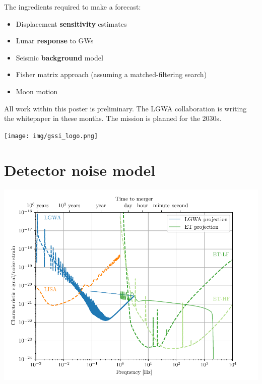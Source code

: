 \documentclass[a0paper,fleqn]{betterposter}
\begin{document}
{The ingredients required to make a forecast:
\begin{itemize}
    \item Displacement \textbf{sensitivity} estimates
    \item Lunar \textbf{response} to GWs
    \item Seismic \textbf{background} model
    \item Fisher matrix approach (assuming a matched-filtering search)
    \item Moon motion
\end{itemize}

\vfill
All work within this poster is preliminary.
The LGWA collaboration is writing the whitepaper in these months.
The mission is planned for the 2030s.
\vspace{5mm}

\begin{center}
    \texttt{[image: img/gssi\_logo.png]}\\
\end{center}

}{
\section{Detector noise model}
\includegraphics[width=\textwidth]{../plots/sensitivity_curves.pdf}
}
\end{document}
